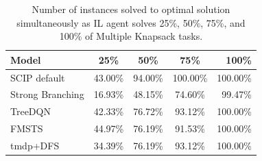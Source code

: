 \documentclass[preprint,12pt]{elsarticle} %
\theoremstyle{plain}
\theoremstyle{definition}
\theoremstyle{remark}
\begin{document}
\begin{table}[t]
\caption{Number of instances solved to optimal solution simultaneously as IL agent solves 25\%, 50\%, 75\%, and 100\% of Maximum Independent Set and Facility Location tasks.}\label{tab:wr_indset_ucfl}
\begin{center}
\end{center}
\end{table}

\begin{table}[t]
\caption{Number of instances solved to optimal solution simultaneously as IL agent solves 25\%, 50\%, 75\%, and 100\% of Multiple Knapsack tasks.}\label{tab:wr_knapsack}
\begin{center}
\footnotesize
\begin{sc}
    \begin{tabular}{lcccr}
         \hline
         Model & 25\% & 50\% & 75\% & 100\% \\
         \hline
         SCIP default & 43.00\% & 94.00\% & 100.00\% & 100.00\% \\
         Strong Branching & 16.93\% & 48.15\% & 74.60\% & 99.47\% \\
         \hline
         TreeDQN & 42.33\% & 76.72\% & 93.12\% & 100.00\% \\
         FMSTS & 44.97\% & 76.19\% & 91.53\% & 100.00\% \\
         tmdp+DFS & 34.39\% & 76.19\% & 93.12\% & 100.00\% \\
         \hline
    \end{tabular}
\end{sc}
\end{center}
\end{table}
\end{document}
